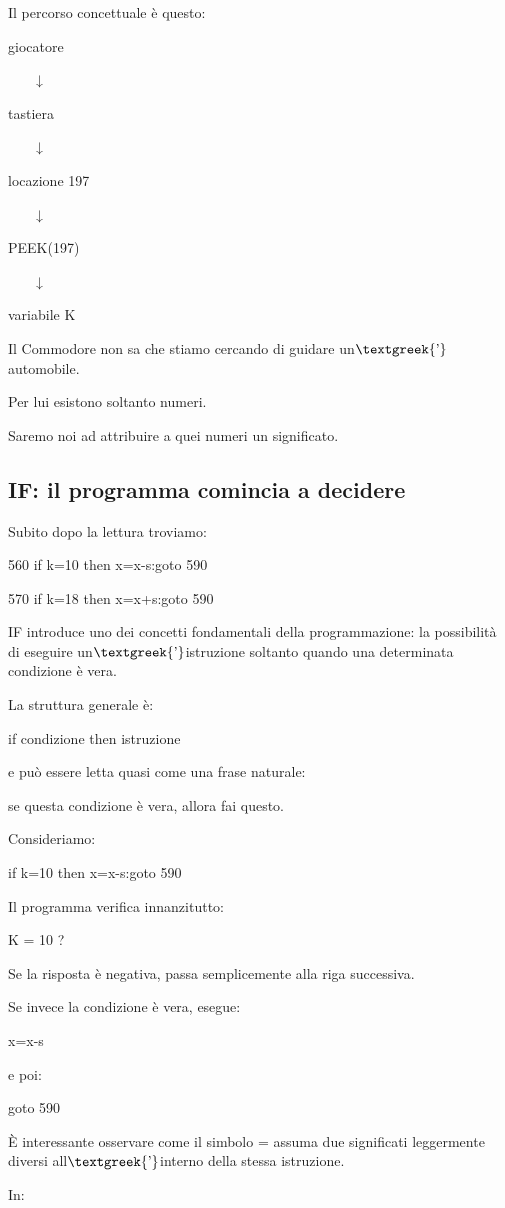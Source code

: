 \documentclass{article}
\begin{document}
Il percorso concettuale è questo:

giocatore

\ \ \ \ ↓

tastiera

\ \ \ \ ↓

locazione 197

\ \ \ \ ↓

PEEK(197)

\ \ \ \ ↓

variabile K

Il Commodore non sa che stiamo cercando di guidare un$\text{\textgreek{’}}$automobile.

Per lui esistono soltanto numeri.

Saremo noi ad attribuire a quei numeri un significato.

\subsection{IF: il programma comincia a decidere}
Subito dopo la lettura troviamo:

560 if k=10 then x=x-s:goto 590

570 if k=18 then x=x+s:goto 590

IF introduce uno dei concetti fondamentali della programmazione: la possibilità di eseguire
un$\text{\textgreek{’}}$istruzione soltanto quando una determinata condizione è vera.

La struttura generale è:

if condizione then istruzione

e può essere letta quasi come una frase naturale:

se questa condizione è vera, allora fai questo.

Consideriamo:

if k=10 then x=x-s:goto 590

Il programma verifica innanzitutto:

K = 10 ?

Se la risposta è negativa, passa semplicemente alla riga successiva.

Se invece la condizione è vera, esegue:

x=x-s

e poi:

goto 590

È interessante osservare come il simbolo = assuma due significati leggermente diversi all$\text{\textgreek{’}}$interno
della stessa istruzione.

In:
\end{document}
